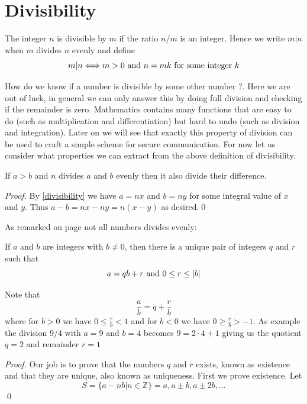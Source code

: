 \section{Divisibility}
The integer $n$ is divisible by $m$ if the ratio $n/m$ is an integer. Hence we write $m|n$ when $m$ divides $n$ evenly and define
\begin{equation}\label{divisibility}
m|n \Longleftrightarrow m > 0 \textnormal{ and } n = mk \textnormal{ for some integer } k
\end{equation}

How do we know if a number is divisible by some other number ?. Here we are out of luck, in general we can only answer
this by doing full division and checking if the remainder is zero. Mathematics contains many functions that are easy to
do (such as multiplication and differentiation) but hard to undo (such as division and integration). Later on we will
see that exactly this property of division can be used to craft a simple scheme for secure communication. For now
let us consider what properties we can extract from the above definition of divisibility.
\begin{prop}
If $a > b$ and $n$ divides $a$ and $b$ evenly then it also divide their difference.
\end{prop}
\begin{proof} 
By \ref{divisibility} we have $a = nx$ and  $b = ny$ for some integral value of $x$ and $y$. Thus $a-b = nx - ny =
n(x-y)$ as desired.\qed
\end{proof}

As remarked on page \pageref{remainder} not all numbers divides evenly: 
\begin{prop}\label{division_algorithm}
If $a$ and $b$ are integers with $b\neq0$, then there is a unique pair of integers $q$ and $r$ such that
\[
a = qb+r \textnormal{ and } 0 \leq r \leq |b| 
\]
\end{prop}
Note that 
\[
\frac{a}{b} = q + \frac{r}{b}  
\] 
where for $b>0$ we have $0 \leq \frac{r}{b} < 1$ and for $b<0$ we have $0 \geq \frac{r}{b} > -1$. As example the
division $9/4$ with $a=9$ and $b=4$ becomes $9=2\cdot4 + 1$ giving us the quotient $q=2$ and remainder $r=1$
\begin{proof}
Our job is to prove that the numbers $q$ and $r$ exists, known as existence and that they are unique, also known
as uniqueness. First we prove existence. Let
\[
S = \{a-nb|n \in \mathbb{Z}\} = {a,a \pm b,a \pm 2b,...}
\]
\qed
\end{proof}


